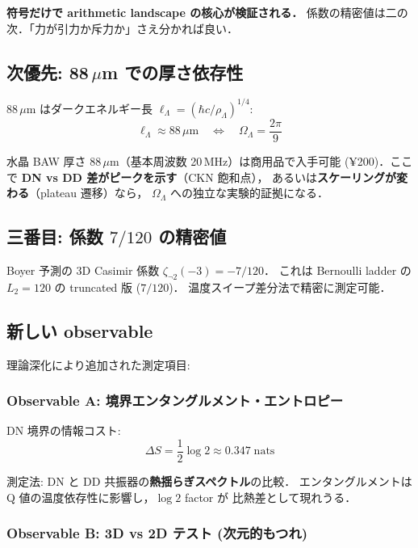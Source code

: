 \documentclass[11pt,a4paper]{article}
\begin{document}
\textbf{符号だけで arithmetic landscape の核心が検証される．}
係数の精密値は二の次．「力が引力か斥力か」さえ分かれば良い．

\subsection{次優先: 88\,$\mu$m での厚さ依存性}

$88\,\mu$m はダークエネルギー長 $\ell_\Lambda = (\hbar c/\rho_\Lambda)^{1/4}$:
\begin{equation}
\ell_\Lambda \approx 88\,\mu\text{m} \quad \Longleftrightarrow \quad
\Omega_\Lambda = \frac{2\pi}{9}
\end{equation}

水晶 BAW 厚さ $88\,\mu$m（基本周波数 20\,MHz）は商用品で入手可能
(¥200)．ここで \textbf{DN vs DD 差がピークを示す}（CKN 飽和点），
あるいは\textbf{スケーリングが変わる}（plateau 遷移）なら，
$\Omega_\Lambda$ への独立な実験的証拠になる．

\subsection{三番目: 係数 $7/120$ の精密値}

Boyer 予測の 3D Casimir 係数 $\zeta_{\neg 2}(-3) = -7/120$．
これは Bernoulli ladder の $L_2 = 120$ の truncated 版 ($7/120$)．
温度スイープ差分法で精密に測定可能．

\subsection{新しい observable}

理論深化により追加された測定項目:

\subsubsection{Observable A: 境界エンタングルメント・エントロピー}

DN 境界の情報コスト:
\begin{equation}
\Delta S = \frac{1}{2}\log 2 \approx 0.347\;\text{nats}
\end{equation}

測定法: DN と DD 共振器の\textbf{熱揺らぎスペクトル}の比較．
エンタングルメントは Q 値の温度依存性に影響し，$\log 2$ factor が
比熱差として現れうる．

\subsubsection{Observable B: 3D vs 2D テスト (次元的もつれ)}
\end{document}
